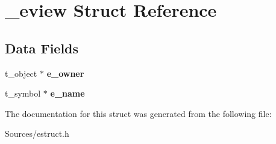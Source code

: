 \hypertarget{struct__eview}{\section{\-\_\-eview Struct Reference}
\label{struct__eview}
}
\subsection*{Data Fields}
\begin{DoxyCompactItemize}
\item 
\hypertarget{struct__eview_a2a35e154dc0053b0c8078d322ee1b5e3}{t\-\_\-object $\ast$ {\bfseries e\-\_\-owner}}\label{struct__eview_a2a35e154dc0053b0c8078d322ee1b5e3}

\item 
\hypertarget{struct__eview_a6d8c2140844c7949fe9bc0384b2129d8}{t\-\_\-symbol $\ast$ {\bfseries e\-\_\-name}}\label{struct__eview_a6d8c2140844c7949fe9bc0384b2129d8}

\end{DoxyCompactItemize}


The documentation for this struct was generated from the following file\-:\begin{DoxyCompactItemize}
\item 
Sources/estruct.\-h\end{DoxyCompactItemize}
